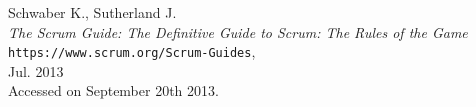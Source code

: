 \begin{thebibliography}{9}

    Schwaber K., Sutherland J.\\
   \emph{The Scrum Guide: The Definitive Guide to Scrum: The Rules of the Game}\\
     \verb+https://www.scrum.org/Scrum-Guides+,\\
    Jul. 2013\\
    Accessed on September 20th 2013.

\end{thebibliography}